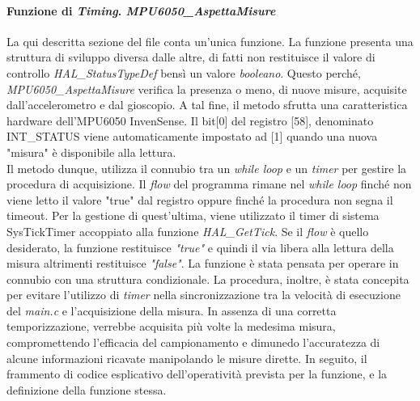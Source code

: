 \paragraph{Funzione di \textit{Timing}. \textit{MPU6050\_AspettaMisure}}
La qui descritta sezione del file conta un'unica funzione. La funzione presenta una struttura di sviluppo diversa dalle altre, di fatti non restituisce il valore di controllo \textit{HAL\_StatusTypeDef} bensì un valore \textit{booleano}. Questo perché,
\textit{MPU6050\_AspettaMisure} verifica la presenza o meno, di nuove misure, acquisite dall'accelerometro e dal gioscopio. A tal fine, il metodo sfrutta una caratteristica hardware dell'MPU6050 InvenSense.
Il bit[0] del registro [58], denominato INT\_STATUS viene automaticamente impostato ad [1] quando una nuova "misura" è disponibile alla lettura.\\
Il metodo dunque, utilizza il connubio tra un \textit{while loop} e un \textit{timer} per gestire la procedura di acquisizione.
Il \textit{flow} del programma rimane nel \textit{while loop} finché non viene letto il valore "true" dal registro oppure finché la procedura non segna il timeout. Per la gestione di quest'ultima, viene utilizzato il timer di sistema SysTickTimer accoppiato alla funzione \textit{HAL\_GetTick}.
Se il \textit{flow} è quello desiderato, la funzione restituisce \textit{"true"} e quindi il via libera alla lettura della misura altrimenti restituisce \textit{"false"}.
La funzione è stata pensata per operare in connubio con una struttura condizionale.
La procedura, inoltre, è stata concepita per evitare l'utilizzo di \textit{timer} nella sincronizzazione tra la velocità di esecuzione del \textit{main.c} e l'acquisizione della misura. In assenza di una corretta temporizzazione, verrebbe acquisita più volte la medesima misura, compromettendo l'efficacia del campionamento e dimunedo l'accuratezza di alcune informazioni ricavate manipolando le misure dirette.
In seguito, il frammento di codice esplicativo dell'operatività prevista per la funzione, e la definizione della funzione stessa.


